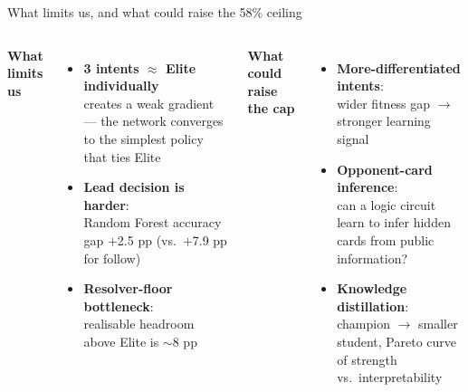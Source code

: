 \documentclass[10pt]{beamer}
\begin{document}
\begin{frame}{What limits us, and what could raise the 58\% ceiling}
  \begin{columns}[T]
      \textbf{What limits us}\\[6pt]
      \begin{itemize}
        \item \textbf{3 intents $\approx$ Elite individually}\\creates a weak gradient — the network converges to the simplest policy that ties Elite
        \item \textbf{Lead decision is harder}:\\Random Forest accuracy gap $+$2.5 pp (vs.\ $+$7.9 pp for follow)
        \item \textbf{Resolver-floor bottleneck}:\\realisable headroom above Elite is $\sim$8 pp
      \end{itemize}
      \textbf{What could raise the cap}\\[6pt]
      \begin{itemize}
        \item \textbf{More-differentiated intents}:\\wider fitness gap $\rightarrow$ stronger learning signal
        \item \textbf{Opponent-card inference}:\\can a logic circuit learn to infer hidden cards from public information?
        \item \textbf{Knowledge distillation}:\\champion $\rightarrow$ smaller student, Pareto curve of strength vs.\ interpretability
      \end{itemize}
  \end{columns}
  \vspace{6pt}
  \centering
\end{frame}
\end{document}
